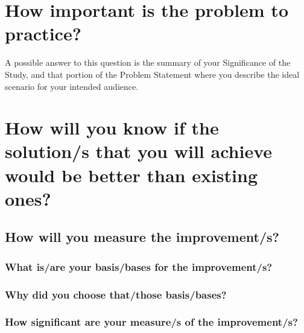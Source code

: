 


\section*{\thesection\quad  How important is the problem to practice?}

A possible answer to this question is the summary of your Significance of the Study, and that portion of the Problem Statement where you describe the ideal scenario for your intended audience. 

\graytx{\blindtext}
	
	
	
	
\section*{\thesection\quad  How will you know if the solution/s that you will achieve would be better than existing ones?}	

\graytx{\blindtext}


\subsection*{\thesubsection\quad How will you measure the improvement/s?}	

\graytx{\blindtext}

	
\subsubsection*{\thesubsubsection\quad  What is/are your basis/bases for the improvement/s?}

\graytx{\blindtext}
	
		
\subsubsection*{\thesubsubsection\quad  Why did you choose that/those basis/bases?}

\graytx{\blindtext}

				
\subsubsection*{\thesubsubsection\quad  How significant are your measure/s of the improvement/s?}

\graytx{\blindtext}







